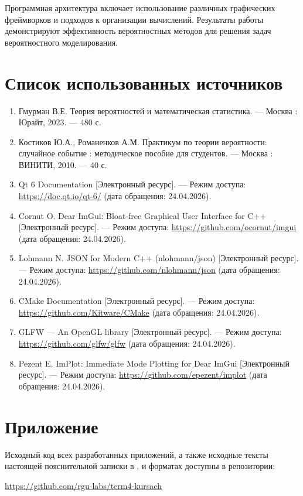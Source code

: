 \documentclass[14pt]{extarticle}
\renewcommand{\texttt}[1]{{\codefont \seqsplit{#1}}}
\begin{document}
Программная архитектура включает использование различных графических фреймворков и подходов к организации вычислений. Результаты работы демонстрируют эффективность вероятностных методов для решения задач вероятностного моделирования.

\clearpage
\section{Список использованных источников}
\label{sec:orgef87fd7}

\begin{enumerate}
\item Гмурман В.Е. Теория вероятностей и математическая статистика. --- Москва : Юрайт, 2023. --- 480 с.
\item Костиков Ю.А., Романенков А.М. Практикум по теории вероятности: случайное событие : методическое пособие для студентов. --- Москва : ВИНИТИ, 2010. --- 40 с.
\item Qt 6 Documentation [Электронный ресурс]. --- Режим доступа: \url{https://doc.qt.io/qt-6/} (дата обращения: 24.04.2026).
\item Cornut O. Dear ImGui: Bloat-free Graphical User Interface for C++ [Электронный ресурс]. --- Режим доступа: \url{https://github.com/ocornut/imgui} (дата обращения: 24.04.2026).
\item Lohmann N. JSON for Modern C++ (nlohmann/json) [Электронный ресурс]. --- Режим доступа: \url{https://github.com/nlohmann/json} (дата обращения: 24.04.2026).
\item CMake Documentation [Электронный ресурс]. --- Режим доступа: \url{https://github.com/Kitware/CMake} (дата обращения: 24.04.2026).
\item GLFW --- An OpenGL library [Электронный ресурс]. --- Режим доступа: \url{https://github.com/glfw/glfw} (дата обращения: 24.04.2026).
\item Pezent E. ImPlot: Immediate Mode Plotting for Dear ImGui [Электронный ресурс]. --- Режим доступа: \url{https://github.com/epezent/implot} (дата обращения: 24.04.2026).
\end{enumerate}

\clearpage
\section{Приложение}
\label{sec:orgdc69374}

Исходный код всех разработанных приложений, а также исходные тексты настоящей пояснительной записки в \texttt{pdf}, \texttt{org} и \texttt{tex} форматах доступны в репозитории:

\url{https://github.com/rgu-labs/term4-kursach}
\end{document}
